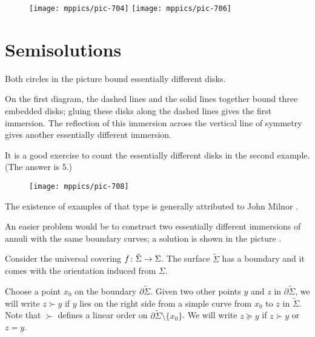 {

\begin{wrapfigure}{r}{29 mm}
\vskip-4mm
\centering
\texttt{[image: mppics/pic-704]}
\bigskip
\texttt{[image: mppics/pic-706]}
\end{wrapfigure}

\section*{Semisolutions}

Both circles in the picture bound essentially different disks.



\medskip

On the first diagram, the dashed lines and the solid lines together bound three embedded disks;
gluing these disks along the dashed lines gives the first immersion.
The reflection of this immersion across the vertical line of symmetry gives another essentially different immersion.
\qeds

}


It is a good exercise to count the essentially different disks in the second example. 
(The answer is 5.) 

{

\begin{wrapfigure}{r}{30 mm}
\vskip-7mm
\centering
\texttt{[image: mppics/pic-708]}
\end{wrapfigure}

The existence of examples of that type is generally attributed to John Milnor \cite{bennequin}.

An easier problem would be to construct two essentially different immersions of annuli with the same boundary curves; a solution is shown in the picture \cite[for more details and references see][]{eppstein-mumford}.

}

Consider the universal covering 
$f\:\tilde\Sigma\z\to\Sigma$.
The surface $\tilde \Sigma$ has a boundary and it comes with the orientation induced from $\Sigma$.



Choose a point $x_0$ on the boundary $\partial \tilde \Sigma$.
Given two other points $y$ and $z$ in $\partial \tilde \Sigma$, we will write
$z\succ y$ if $y$ lies on the right side from a simple curve from $x_0$ to $z$ in $\tilde\Sigma$.
Note that  $\succ $ defines a linear order on $\partial\tilde\Sigma\setminus\{x_0\}$.
We will write $z \succeq y$ 
if $z\succ y$ or $z=y$.

